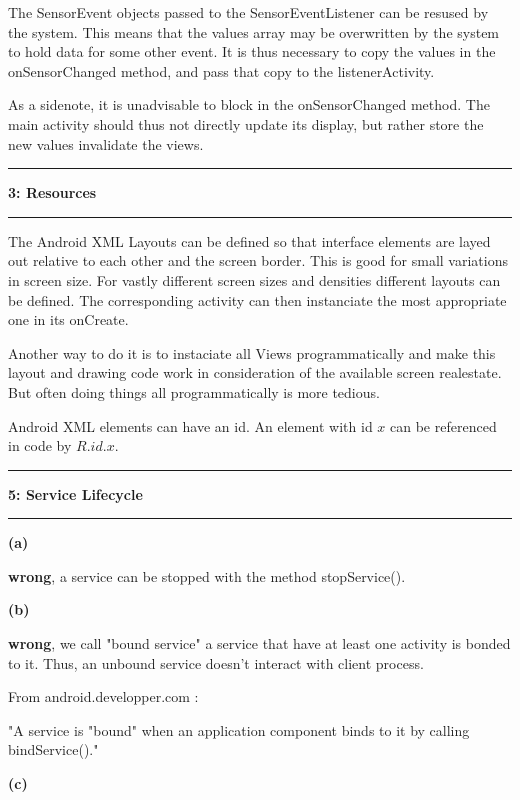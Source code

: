 \documentclass[11pt]{article}
\newcommand\question[2]{\vspace{.25in}\hrule\textbf{#1: #2}\vspace{.5em}\hrule\vspace{.10in}}
\renewcommand\part[1]{\vspace{.10in}\textbf{(#1)}}
\begin{document}
The SensorEvent objects passed to the SensorEventListener can be resused by the system. This means that the values array may be overwritten by the system to hold data for some other event. It is thus necessary to copy the values in the onSensorChanged method, and pass that copy to the listenerActivity.

As a sidenote, it is unadvisable to block in the onSensorChanged method. The main activity should thus not directly update its display, but rather store the new values invalidate the views.

\question{3}{Resources}

The Android XML Layouts can be defined so that interface elements are layed out relative to each other and the screen border. This is good for small variations in screen size. For vastly different screen sizes and densities different layouts can be defined. The corresponding activity can then instanciate the most appropriate one in its onCreate.

Another way to do it is to instaciate all Views programmatically and make this layout and drawing code work in consideration of the available screen realestate. But often doing things all programmatically is more tedious.

Android XML elements can have an id. An element with id $x$ can be referenced in code by $R.id.x$.


\question{5}{Service Lifecycle} 

\part{a} 

\textbf{wrong}, a service can be stopped with the method stopService().

\part{b}

\textbf{wrong}, we call "bound service" a service that have at least one activity is bonded to it. Thus, an unbound service doesn't interact with client process.

From android.developper.com :

"A service is "bound" when an application component binds to it by calling bindService()."

\part{c}
\end{document}
